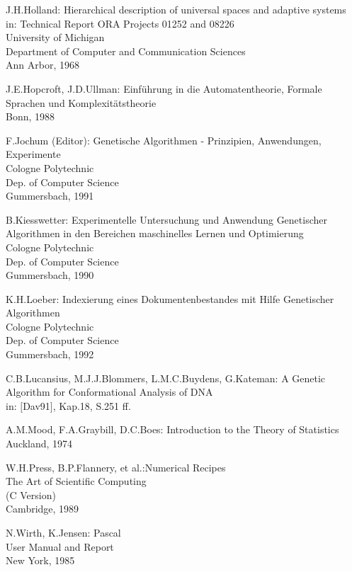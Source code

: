 \begin{thebibliography}{99}
J.H.Holland: Hierarchical description of universal spaces
and adaptive systems\\
                      in: Technical Report ORA Projects 01252 and 08226\\
                      University of Michigan\\
                      Department of Computer and Communication Sciences\\
                      Ann Arbor, 1968

J.E.Hopcroft, J.D.Ullman: Einf\"uhrung in die Automatentheorie,
                      Formale Sprachen und Komplexit\"atstheorie\\
                      Bonn, 1988

F.Jochum (Editor): Genetische Algorithmen - Prinzipien,
Anwendungen, Experimente\\
                      Cologne Polytechnic\\
                      Dep. of Computer Science\\
                      Gummersbach, 1991

B.Kiesswetter: Experimentelle Untersuchung und Anwendung
Genetischer Algorithmen in den Bereichen maschinelles Lernen und Optimierung\\
                      Cologne Polytechnic\\
                      Dep. of Computer Science\\
                      Gummersbach, 1990

K.H.Loeber: Indexierung eines Dokumentenbestandes mit Hilfe
Genetischer Algorithmen\\
                      Cologne Polytechnic\\
                      Dep. of Computer Science\\
                      Gummersbach, 1992

C.B.Lucansius, M.J.J.Blommers, L.M.C.Buydens, G.Kateman:
                      A Genetic Algorithm for Conformational Analysis of DNA\\
                      in: $[$Dav91$]$, Kap.18, S.251 ff.

A.M.Mood, F.A.Graybill, D.C.Boes: Introduction to the
                      Theory of Statistics\\
                      Auckland, 1974

W.H.Press, B.P.Flannery, et al.:Numerical Recipes\\
                      The Art of Scientific Computing\\
                      (C Version)\\
                      Cambridge, 1989

N.Wirth, K.Jensen: Pascal\\
                      User Manual and Report\\
                      New York, 1985
\end{thebibliography}

